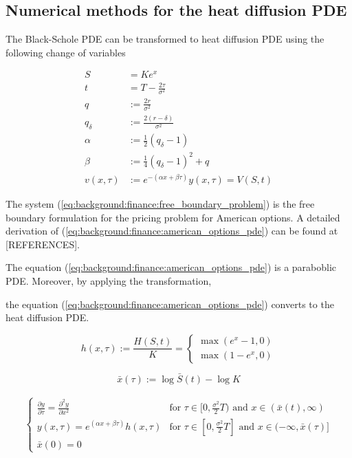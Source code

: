 \subsection{Numerical methods for the heat diffusion PDE}

The Black-Schole PDE can be transformed to heat diffusion PDE using the following
change of variables

\begin{align*}
  S &= Ke^x \\
  t &= T - \frac{2\tau}{\sigma^2} \\ 
  q &:= \frac{2r}{\sigma^2} \\
  q_{\delta} &:= \frac{2(r-\delta)}{\sigma^2} \\
  \alpha &:= \frac{1}{2}(q_{\delta} - 1) \\
  \beta &:= \frac{1}{4}(q_{\delta} - 1)^2 + q \\
  v(x, \tau) &:= e^{-(\alpha x + \beta \tau)}y(x, \tau)= V(S, t)
\end{align*}

The system (\ref{eq:background:finance:free_boundary_problem}) 
is the free boundary formulation for the pricing problem for American options.
A detailed derivation of (\ref{eq:background:finance:american_options_pde}) 
can be found at [REFERENCES].


The equation (\ref*{eq:background:finance:american_options_pde}) 
is a paraboblic PDE. Moreover, by applying the transformation,


the equation (\ref*{eq:background:finance:american_options_pde}) converts 
to the heat diffusion PDE.

\begin{equation}
  h(x, \tau) := \frac{H(S, t)}{K} = \begin{cases}
    \max(e^{x} - 1, 0)\\
    \max(1 - e^{x}, 0)
  \end{cases} 
\end{equation}

\begin{equation}
  \bar{x}(\tau) := \log{\bar{S}(t)} - \log{K} 
\end{equation}

\begin{align}
  \begin{cases}
    \frac{\partial y}{\partial \tau} = \frac{\partial^2 y}{\partial x^2} & \text{for $\tau\in[0,\frac{\sigma^2}{2}T)$ and $x\in(\bar{x}(t), \infty)$} \\
    y(x, \tau) = e^{(\alpha x + \beta \tau)}h(x, \tau) & \text{for $\tau\in[0, \frac{\sigma^2}{2}T]$ and $x\in(-\infty, \bar{x}(\tau)]$} \\
    \bar{x}(0) = 0
  \end{cases}
  \label{eq:background:finance:american_option_heat_equation}
\end{align}

